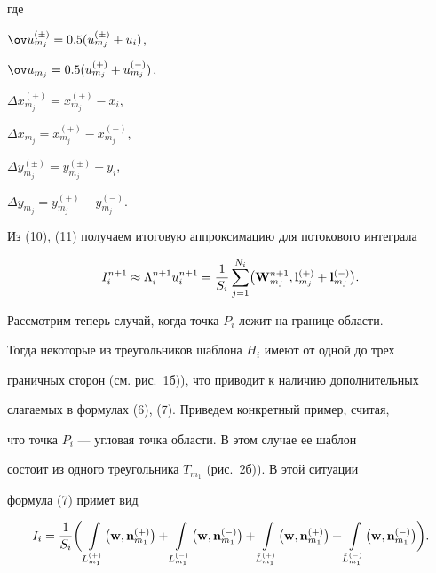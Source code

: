 где


$\ov u_{m_j}^{(\pm)}=0.5(u_{m_j}^{(\pm)}+u_i)$,


$\ov u_{m_j}=0.5(u_{m_j}^{(+)}+u_{m_j}^{(-)})$,


$\Delta x_{m_j}^{(\pm)}=x_{m_j}^{(\pm)}-x_i$,


$\Delta x_{m_j}=x_{m_j}^{(+)}-x_{m_j}^{(-)}$,


$\Delta y_{m_j}^{(\pm)}=y_{m_j}^{(\pm)}-y_i$,


$\Delta y_{m_j}=y_{m_j}^{(+)}-y_{m_j}^{(-)}$.


Из (10), (11) получаем итоговую аппроксимацию для потокового интеграла


\begin{equation}


\lEq{13}


I_i^{n+1} \approx \Lambda_i^{n+1} u_i^{n+1} =


\frac{1}{S_i}\sum_{j=1}^{N_i}\bigl(


{\bold W}_{m_j}^{n+1},{\bold l}_{m_j}^{(+)}+{\bold l}_{m_j}^{(-)}\bigr).


\end{equation}





Рассмотрим теперь случай, когда точка $P_i$ лежит на границе области.


Тогда некоторые из треугольников шаблона $H_i$ имеют от одной до трех


граничных сторон (см. рис.~1б)), что приводит к наличию дополнительных


слагаемых в формулах (6), (7). Приведем конкретный пример, считая,


что точка $P_i$ --- угловая точка области. В этом случае ее шаблон


состоит из одного треугольника $T_{m_1}$ (рис.~2б)). В этой ситуации


формула (7) примет вид


\begin{equation}


\lEq{14}


I_i = \frac{1}{S_i}\bigg(


\int\limits_{L_{m_1}^{(+)}}\bigl({\bold w},{\bold n}_{m_1}^{(+)}\bigr) + 


\int\limits_{L_{m_1}^{(-)}}\bigl({\bold w},{\bold n}_{m_1}^{(-)}\bigr) +


\int\limits_{\tilde L_{m_1}^{(+)}}


\bigl({\bold w},{\bold n}_{m_1}^{(+)}\bigr) + 


\int\limits_{\tilde L_{m_1}^{(-)}}


\bigl({\bold w},{\bold n}_{m_1}^{(-)}\bigr)


\bigg).


\end{equation}


